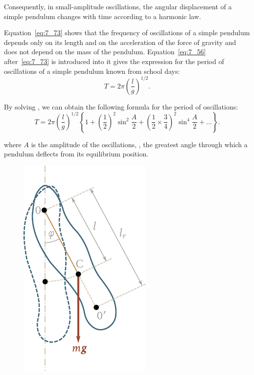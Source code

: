 \noindent
Consequently, in small-amplitude oscillations, the angular displacement of a simple pendulum changes with time according to a harmonic law.

Equation~\eqref{eq:7_73} shows that the frequency of oscillations of a simple pendulum depends only on its length and on the acceleration of the force of gravity and does not depend on the mass of the pendulum. Equation~\eqref{eq:7_56} after~\eqref{eq:7_73} is introduced into it gives the expression for the period of oscillations of a simple pendulum known from school days:
\begin{equation}\label{eq:7_76}
	T = 2\pi\left(\frac{l}{g}\right)^{1/2}.
\end{equation}

By solving , we can obtain the following formula for the period of oscillations:
\begin{equation}\label{eq:7_77}
	T = 2\pi\left(\frac{l}{g}\right)^{1/2}\left\{1 + \left(\frac{1}{2}\right)^2 \sin^2\frac{A}{2} + \left(\frac{1}{2}\times\frac{3}{4}\right)^2\sin^4\frac{A}{2} + \ldots\right\}.
\end{equation}

\noindent
where $A$ is the amplitude of the oscillations, \ie, the greatest angle through which a pendulum deflects from its equilibrium position.

\begin{figure}[t]
	\begin{center}
		\includegraphics[scale=0.9]{figures/ch_07/fig_7_8.pdf}
		\caption[]{}
		\label{fig:7_8}
	\end{center}
	\vspace{-0.8cm}
\end{figure}

